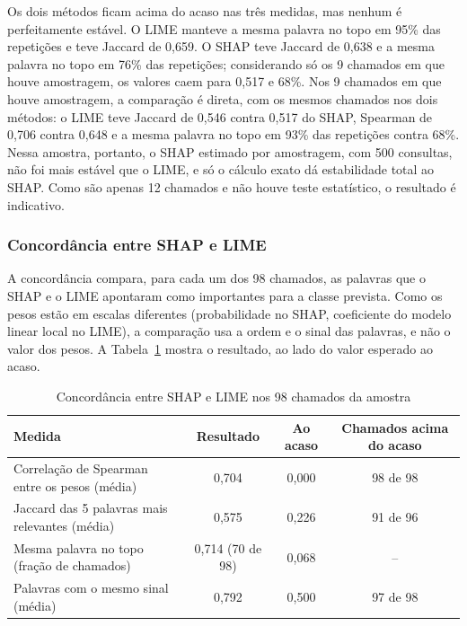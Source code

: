 \documentclass[
    12pt,                %
    openright,           %
    oneside,             %
    a4paper,             %
    english,             %
    brazil               %
]{abntex2}
\begin{document}
Os dois métodos ficam acima do acaso nas três medidas, mas nenhum é perfeitamente estável. O LIME manteve a mesma palavra no topo em 95\% das repetições e teve Jaccard de 0,659. O SHAP teve Jaccard de 0,638 e a mesma palavra no topo em 76\% das repetições; considerando só os 9 chamados em que houve amostragem, os valores caem para 0,517 e 68\%. Nos 9 chamados em que houve amostragem, a comparação é direta, com os mesmos chamados nos dois métodos: o LIME teve Jaccard de 0,546 contra 0,517 do SHAP, Spearman de 0,706 contra 0,648 e a mesma palavra no topo em 93\% das repetições contra 68\%. Nessa amostra, portanto, o SHAP estimado por amostragem, com 500 consultas, não foi mais estável que o LIME, e só o cálculo exato dá estabilidade total ao SHAP. Como são apenas 12 chamados e não houve teste estatístico, o resultado é indicativo.

\subsubsection{Concordância entre SHAP e LIME}
\label{subsubsec:res_concordancia}

A concordância compara, para cada um dos 98 chamados, as palavras que o SHAP e o LIME apontaram como importantes para a classe prevista. Como os pesos estão em escalas diferentes (probabilidade no SHAP, coeficiente do modelo linear local no LIME), a comparação usa a ordem e o sinal das palavras, e não o valor dos pesos. A Tabela~\ref{tab:res_concordancia} mostra o resultado, ao lado do valor esperado ao acaso.

\begin{table}[htb]
  \centering
  \caption{Concordância entre SHAP e LIME nos 98 chamados da amostra}
  \label{tab:res_concordancia}
  \small
  \begin{tabular}{p{5.6cm}ccc}
    \toprule
    Medida & Resultado & Ao acaso & Chamados acima do acaso \\
    \midrule
    Correlação de Spearman entre os pesos (média) & 0,704 & 0,000 & 98 de 98 \\
    Jaccard das 5 palavras mais relevantes (média) & 0,575 & 0,226 & 91 de 96 \\
    Mesma palavra no topo (fração de chamados) & 0,714 (70 de 98) & 0,068 & -- \\
    Palavras com o mesmo sinal (média) & 0,792 & 0,500 & 97 de 98 \\
    \bottomrule
  \end{tabular}
\end{table}
\end{document}
